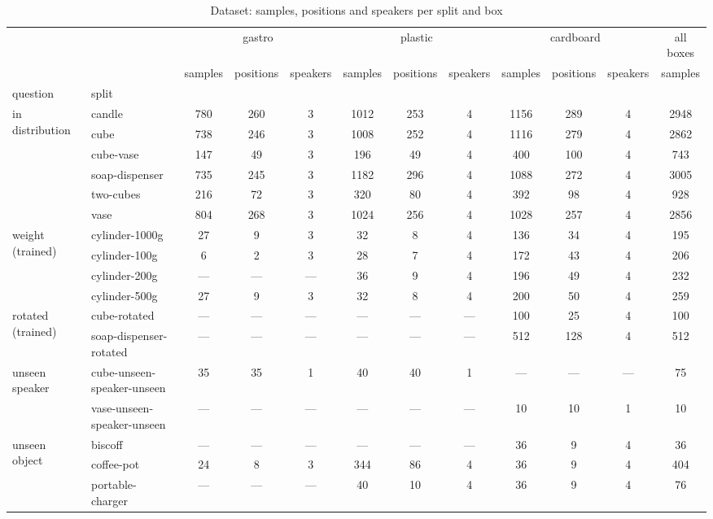 \begin{table}
\caption{Dataset: samples, positions and speakers per split and box}
\label{tab:dataset}
\begin{tabular}{ll|ccc|ccc|ccc|c}
\toprule
 &  & \multicolumn{3}{c}{gastro} & \multicolumn{3}{c}{plastic} & \multicolumn{3}{c}{cardboard} & all boxes \\
 &  & samples & positions & speakers & samples & positions & speakers & samples & positions & speakers & samples \\
question & split &  &  &  &  &  &  &  &  &  &  \\
\midrule
\multirow[t]{6}{*}{in distribution} & candle & 780 & 260 & 3 & 1012 & 253 & 4 & 1156 & 289 & 4 & 2948 \\
 & cube & 738 & 246 & 3 & 1008 & 252 & 4 & 1116 & 279 & 4 & 2862 \\
 & cube-vase & 147 & 49 & 3 & 196 & 49 & 4 & 400 & 100 & 4 & 743 \\
 & soap-dispenser & 735 & 245 & 3 & 1182 & 296 & 4 & 1088 & 272 & 4 & 3005 \\
 & two-cubes & 216 & 72 & 3 & 320 & 80 & 4 & 392 & 98 & 4 & 928 \\
 & vase & 804 & 268 & 3 & 1024 & 256 & 4 & 1028 & 257 & 4 & 2856 \\
\cline{1-12}
\multirow[t]{4}{*}{weight (trained)} & cylinder-1000g & 27 & 9 & 3 & 32 & 8 & 4 & 136 & 34 & 4 & 195 \\
 & cylinder-100g & 6 & 2 & 3 & 28 & 7 & 4 & 172 & 43 & 4 & 206 \\
 & cylinder-200g & — & — & — & 36 & 9 & 4 & 196 & 49 & 4 & 232 \\
 & cylinder-500g & 27 & 9 & 3 & 32 & 8 & 4 & 200 & 50 & 4 & 259 \\
\cline{1-12}
\multirow[t]{2}{*}{rotated (trained)} & cube-rotated & — & — & — & — & — & — & 100 & 25 & 4 & 100 \\
 & soap-dispenser-rotated & — & — & — & — & — & — & 512 & 128 & 4 & 512 \\
\cline{1-12}
\multirow[t]{2}{*}{unseen speaker} & cube-unseen-speaker-unseen & 35 & 35 & 1 & 40 & 40 & 1 & — & — & — & 75 \\
 & vase-unseen-speaker-unseen & — & — & — & — & — & — & 10 & 10 & 1 & 10 \\
\cline{1-12}
\multirow[t]{4}{*}{unseen object} & biscoff & — & — & — & — & — & — & 36 & 9 & 4 & 36 \\
 & coffee-pot & 24 & 8 & 3 & 344 & 86 & 4 & 36 & 9 & 4 & 404 \\
 & portable-charger & — & — & — & 40 & 10 & 4 & 36 & 9 & 4 & 76 \\

\end{tabular}
\end{table}
